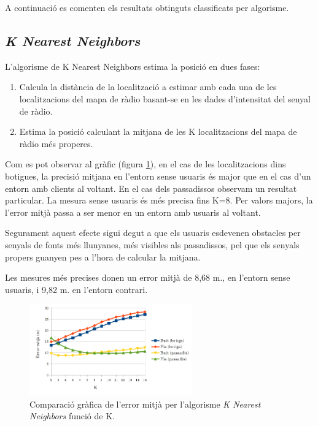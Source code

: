 A continuació es comenten els resultats obtinguts classificats per algorisme.

\subsection{\textit{K Nearest Neighbors}}

L'algorisme de K Nearest Neighbors estima la posició en dues fases:

\begin{enumerate}
    \item Calcula la distància de la localització a estimar amb cada una de les localitzacions del mapa de ràdio basant-se en les dades d'intensitat del senyal de ràdio.
    \item Estima la posició calculant la mitjana de les K localitzacions del mapa de ràdio més properes.
\end{enumerate}

Com es pot observar al gràfic (figura \ref{fig:grafic_mitja_KNN}), en el cas de les localitzacions dins botigues, la precisió mitjana en l'entorn sense usuaris és major que en el cas d'un entorn amb clients al voltant. En el cas dels passadissos observam un resultat particular. La mesura sense usuaris és més precisa fins K=8. Per valors majors, la l'error mitjà passa a ser menor en un entorn amb usuaris al voltant.

Segurament aquest efecte sigui degut a que els usuaris esdevenen obstacles per senyals de fonts més llunyanes, més visibles als passadissos, pel que els senyals propers guanyen pes a l'hora de calcular la mitjana.

Les mesures més precises donen un error mitjà de 8,68 m., en l'entorn sense usuaris, i 9,82 m. en l'entorn contrari.

\begin{figure}[ht]
\begin{center}
\includegraphics[width=7cm]{imatges/knn_mitja.png}
\caption{Comparació gràfica de l'error mitjà per l'algorisme \textit{K Nearest Neighbors} funció de K.}
\label{fig:grafic_mitja_KNN}
\end{center}
\end{figure}


